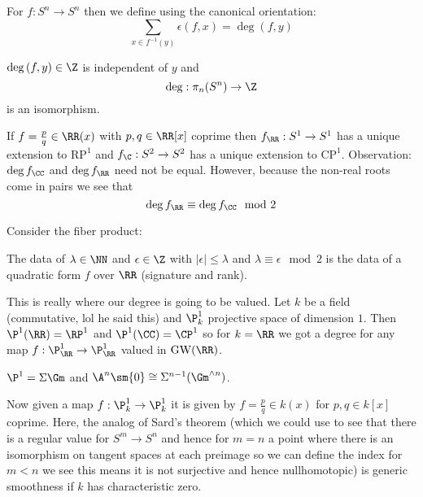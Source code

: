 \documentclass{article}
\begin{document}
\begin{defn}
For $f : S^n \to S^n$ then we define using the canonical orientation:
\[ \sum_{x \in f^{-1}(y)} \epsilon(f, x) = \deg{(f,y)} \]
\end{defn}

\begin{theorem}
$\deg{(f,y)} \in \Z$ is independent of $y$ and
\[ \deg : \pi_n(S^n) \to \Z \]
is an isomorphism. 
\end{theorem}

\begin{example}
If $f = \frac{p}{q} \in \RR(x)$ with $p,q \in \RR[x]$ coprime then $f_{\RR} : S^1 \to S^1$ has a unique extension to $\mathrm{RP}^1$ and $f_{\C} : S^2 \to S^2$ has a unique extension to $\mathrm{CP}^1$. Observation: $\deg{f_{\CC}}$ and $\deg{f_{\RR}}$ need not be equal. However, because the non-real roots come in pairs we see that
\[ \deg{f_{\RR}} \equiv \deg{f_{\CC}} \mod 2 \]

\end{example}

\begin{defn}
Consider the fiber product:
\begin{center}
\end{center}
The data of $\lambda \in \NN$ and $\epsilon \in \Z$ with $|\epsilon| \le \lambda$ and $\lambda \equiv \epsilon \mod 2$ is the data of a quadratic form $f$ over $\RR$ (signature and rank). 
\end{defn}

This is really where our degree is going to be valued. Let $k$ be a field (commutative, lol he said this) and $\P^1_k$ projective space of dimension $1$. Then $\P^1(\RR) = \RP^1$ and $\P^1(\CC) = \CP^1$ so for $k = \RR$ we got a degree for any map $f : \P^1_{\RR} \to \P^1_{\RR}$ valued in $\GW(\RR)$. 

\begin{example}
$\P^1 = \Sigma \Gm$ and $\A^n \sm \{ 0 \} \cong \Sigma^{n-1} (\Gm^{\wedge n})$.
\end{example}

Now given a map $f : \P^1_k \to \P^1_k$ it is given by $f = \frac{p}{q} \in k(x)$ for $p,q \in k[x]$ coprime. Here, the analog of Sard's theorem (which we could use to see that there is a regular value for $S^m \to S^n$ and hence for $m = n$ a point where there is an isomorphism on tangent spaces at each preimage so we can define the index for $m < n$ we see this means it is not surjective and hence nullhomotopic) is generic smoothness if $k$ has characteristic zero. 
\end{document}
